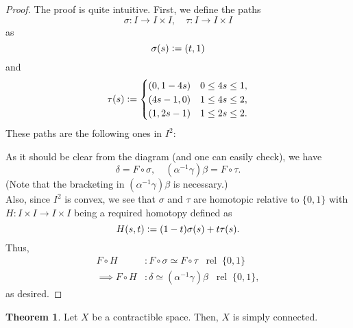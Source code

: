 \documentclass[12pt]{article}
\theoremstyle{definition}
\newtheorem{thm}{Theorem}
\numberwithin{thm}{section}
\newcommand{\rel}{\;\;\operatorname{rel}\;}
\begin{document}
\begin{proof} 
	The proof is quite intuitive. First, we define the paths
	\begin{equation*} 
		\sigma:I \to I\times I, \quad \tau:I \to I \times I
	\end{equation*}
	as
	\begin{equation*} 
		\sigma(s) \vcentcolon= (t, 1)
	\end{equation*}
	and
	\begin{equation*} 
		\tau(s) \vcentcolon= \begin{cases}
			(0, 1 - 4s) & 0 \le 4s \le 1, \\
			(4s - 1, 0) & 1 \le 4s \le 2, \\
			(1, 2s - 1) & 1 \le 2s \le 2.
		\end{cases}
	\end{equation*}
	These paths are the following ones in $I^2:$
	\begin{center}
	\end{center}
	As it should be clear from the diagram (and one can easily check), we have
	\begin{equation*} 
		\delta = F \circ \sigma, \quad (\alpha^{-1}\gamma)\beta = F \circ \tau.
	\end{equation*}
	(Note that the bracketing in $(\alpha^{-1}\gamma)\beta$ is necessary.)\\
	Also, since $I^2$ is convex, we see that $\sigma$ and $\tau$ are homotopic relative to $\{0, 1\}$ with $H:I\times I \to I\times I$ being a required homotopy defined as
	\begin{equation*} 
		H(s , t) \vcentcolon= (1 - t)\sigma(s) + t\tau(s).
	\end{equation*}
	Thus,
	\begin{align*} 
		F \circ H &: F \circ \sigma \simeq F \circ \tau \rel \{0, 1\}\\
		\implies F \circ H &: \delta \simeq (\alpha^{-1}\gamma)\beta \rel \{0, 1\},
	\end{align*}
	as desired.
\end{proof}	
\begin{thm}
	Let $X$ be a contractible space. Then, $X$ is simply connected.
\end{thm}
\end{document}
